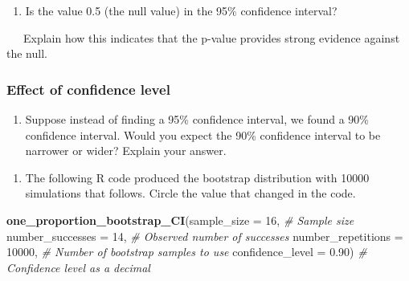 \documentclass[
]{report}
\newenvironment{Shaded}{\begin{snugshade}}{\end{snugshade}}
\newcommand{\AttributeTok}[1]{\textcolor[rgb]{0.13,0.29,0.53}{#1}}
\newcommand{\CommentTok}[1]{\textcolor[rgb]{0.56,0.35,0.01}{\textit{#1}}}
\newcommand{\DecValTok}[1]{\textcolor[rgb]{0.00,0.00,0.81}{#1}}
\newcommand{\FloatTok}[1]{\textcolor[rgb]{0.00,0.00,0.81}{#1}}
\newcommand{\FunctionTok}[1]{\textcolor[rgb]{0.13,0.29,0.53}{\textbf{#1}}}
\newcommand{\NormalTok}[1]{#1}
\providecommand{\tightlist}{%
  \setlength{\itemsep}{0pt}\setlength{\parskip}{0pt}}
\begin{document}
\begin{enumerate}
\def\labelenumi{\arabic{enumi}.}
\setcounter{enumi}{7}
\tightlist
\item
  Is the value 0.5 (the null value) in the 95\% confidence interval?
\end{enumerate}

\vspace{.2in}

~~~Explain how this indicates that the p-value provides strong evidence against the null.

\vspace{0.5in}

\subsubsection*{Effect of confidence level}\label{effect-of-confidence-level}

\begin{enumerate}
\def\labelenumi{\arabic{enumi}.}
\setcounter{enumi}{8}
\tightlist
\item
  Suppose instead of finding a 95\% confidence interval, we found a 90\% confidence interval. Would you expect the 90\% confidence interval to be narrower or wider? Explain your answer.
\end{enumerate}

\vspace{0.4in}

\begin{enumerate}
\def\labelenumi{\arabic{enumi}.}
\setcounter{enumi}{9}
\tightlist
\item
  The following R code produced the bootstrap distribution with 10000 simulations that follows. Circle the value that changed in the code.
\end{enumerate}

\begin{Shaded}
\begin{Highlighting}[]
\FunctionTok{one\_proportion\_bootstrap\_CI}\NormalTok{(}\AttributeTok{sample\_size =} \DecValTok{16}\NormalTok{, }\CommentTok{\# Sample size}
                    \AttributeTok{number\_successes =} \DecValTok{14}\NormalTok{, }\CommentTok{\# Observed number of successes}
                    \AttributeTok{number\_repetitions =} \DecValTok{10000}\NormalTok{, }\CommentTok{\# Number of bootstrap samples to use}
                    \AttributeTok{confidence\_level =} \FloatTok{0.90}\NormalTok{) }\CommentTok{\# Confidence level as a decimal}
\end{Highlighting}
\end{Shaded}
\end{document}

